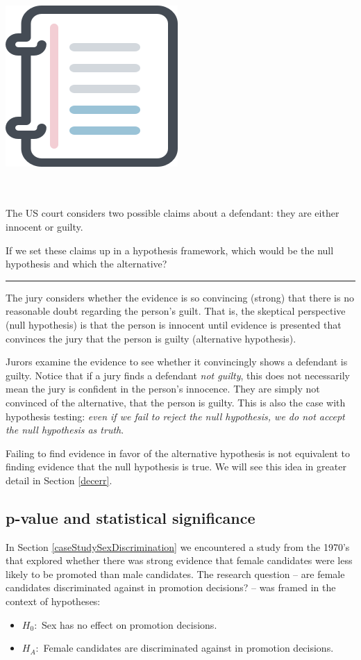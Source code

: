 \documentclass[
  10pt,
  openany]{book}
\newenvironment{mdframedwithfootGPWE}
{   
    \savenotes
    \begin{mdframed}[%
    topline=true, bottomline=true, linecolor=oiB, linewidth=0.5pt,
    rightline=false, leftline=false,
    backgroundcolor=oiLGray]
    \renewcommand{\thempfootnote}{\arabic{footnote}}
    }
{
    \end{mdframed}
    \spewnotes
}
\newenvironment{workedexample}{
    \let\oldrule\rule
    \renewcommand{\rule}[2]{\vspace{-2mm}\oldrule{##1}{##2}\vspace{-2mm}}
\vspace{4mm}
\begin{mdframedwithfootGPWE}
\begin{minipage}[t]{0.10\textwidth}
{$\:$ \\ \setkeys{Gin}{width=2.5em,keepaspectratio}\includegraphics{images/_icons/worked-example.png}}
\end{minipage}
\hfill
\begin{minipage}[t]{0.90\textwidth}
\vspace{-2mm}
\setlength{\parskip}{1em}
\noindent\textbf{\color{oiB}\small\fontfamily{phv}\selectfont{\MakeUppercase{Example}}} $\:$ \\ \\
}{\end{minipage}
\end{mdframedwithfootGPWE}
\vspace{4mm}
}
\begin{document}
\begin{workedexample}
The US court considers two possible claims about a defendant: they are either innocent or guilty.

If we set these claims up in a hypothesis framework, which would be the null hypothesis and which the alternative?

\begin{center}\rule{0.5\linewidth}{0.5pt}\end{center}

The jury considers whether the evidence is so convincing (strong) that there is no reasonable doubt regarding the person's guilt.
That is, the skeptical perspective (null hypothesis) is that the person is innocent until evidence is presented that convinces the jury that the person is guilty (alternative hypothesis).

\end{workedexample}

Jurors examine the evidence to see whether it convincingly shows a defendant is guilty.
Notice that if a jury finds a defendant \emph{not guilty}, this does not necessarily mean the jury is confident in the person's innocence.
They are simply not convinced of the alternative, that the person is guilty.
This is also the case with hypothesis testing: \emph{even if we fail to reject the null hypothesis, we do not accept the null hypothesis as truth}.

Failing to find evidence in favor of the alternative hypothesis is not equivalent to finding evidence that the null hypothesis is true.
We will see this idea in greater detail in Section \ref{decerr}.

\hypertarget{p-value-and-statistical-significance}{%
\subsection{p-value and statistical significance}\label{p-value-and-statistical-significance}}

In Section \ref{caseStudySexDiscrimination} we encountered a study from the 1970's that explored whether there was strong evidence that female candidates were less likely to be promoted than male candidates.
The research question -- are female candidates discriminated against in promotion decisions?
-- was framed in the context of hypotheses:

\begin{itemize}
\item
  \(H_0:\) Sex has no effect on promotion decisions.
\item
  \(H_A:\) Female candidates are discriminated against in promotion decisions.
\end{itemize}
\end{document}
